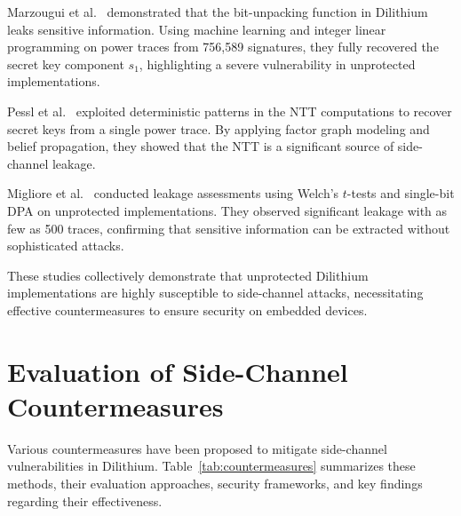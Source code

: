 Marzougui et al.~\cite{Marzougui22} demonstrated that the bit-unpacking function in Dilithium leaks sensitive information. Using machine learning and integer linear programming on power traces from 756,589 signatures, they fully recovered the secret key component $s_1$, highlighting a severe vulnerability in unprotected implementations.

Pessl et al.~\cite{Pessl19} exploited deterministic patterns in the NTT computations to recover secret keys from a single power trace. By applying factor graph modeling and belief propagation, they showed that the NTT is a significant source of side-channel leakage.

Migliore et al.~\cite{Migliore19} conducted leakage assessments using Welch's $t$-tests and single-bit \ac{DPA} on unprotected implementations. They observed significant leakage with as few as 500 traces, confirming that sensitive information can be extracted without sophisticated attacks.

These studies collectively demonstrate that unprotected Dilithium implementations are highly susceptible to side-channel attacks, necessitating effective countermeasures to ensure security on embedded devices.

\section{Evaluation of Side-Channel Countermeasures}

Various countermeasures have been proposed to mitigate side-channel vulnerabilities in Dilithium. Table~\ref{tab:countermeasures} summarizes these methods, their evaluation approaches, security frameworks, and key findings regarding their effectiveness.

